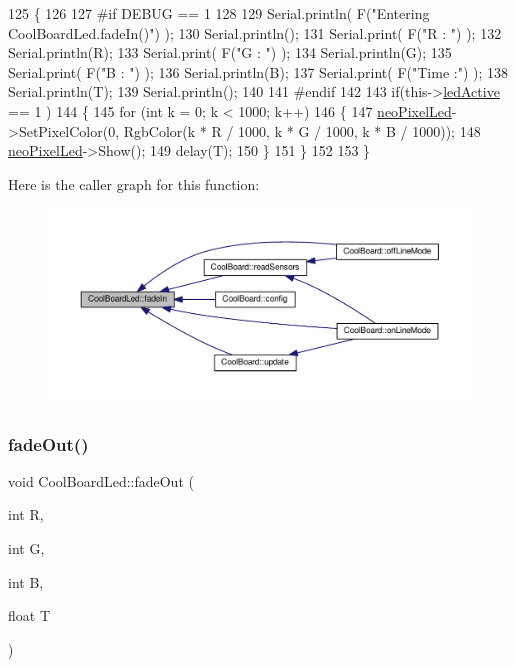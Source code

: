 \begin{DoxyCode}
125 \{
126 
127 \textcolor{preprocessor}{#if DEBUG == 1}
128 
129     Serial.println( F(\textcolor{stringliteral}{"Entering CoolBoardLed.fadeIn()"}) );
130     Serial.println();
131     Serial.print( F(\textcolor{stringliteral}{"R : "}) );
132     Serial.println(R);
133     Serial.print( F(\textcolor{stringliteral}{"G : "}) );
134     Serial.println(G);
135     Serial.print( F(\textcolor{stringliteral}{"B : "}) );
136     Serial.println(B);
137     Serial.print( F(\textcolor{stringliteral}{"Time :"}) );
138     Serial.println(T);
139     Serial.println();
140 
141 \textcolor{preprocessor}{#endif  }
142     
143     \textcolor{keywordflow}{if}(this->\hyperlink{class_cool_board_led_aadd04d2ecf123247718d77f42fba7f08}{ledActive} == 1 )
144     \{
145         \textcolor{keywordflow}{for} (\textcolor{keywordtype}{int} k = 0; k < 1000; k++) 
146         \{
147             \hyperlink{class_cool_board_led_ac2c13fa462a010cd9242bf297c013923}{neoPixelLed}->SetPixelColor(0, RgbColor(k * R / 1000, k * G / 1000, k * B / 1000));
148             \hyperlink{class_cool_board_led_ac2c13fa462a010cd9242bf297c013923}{neoPixelLed}->Show();
149             delay(T);
150         \}
151     \}
152 
153 \}
\end{DoxyCode}
Here is the caller graph for this function\+:\nopagebreak
\begin{figure}[H]
\begin{center}
\leavevmode
\includegraphics[width=350pt]{de/dc0/class_cool_board_led_ab778f5e7bed0ab74e3906d82110493c3_icgraph}
\end{center}
\end{figure}
\mbox{\label{class_cool_board_led_a93d545679237e8cc858324367149775c}} 
\subsubsection{\texorpdfstring{fade\+Out()}{fadeOut()}}
{\footnotesize\ttfamily void Cool\+Board\+Led\+::fade\+Out (\begin{DoxyParamCaption}\item[{int}]{R,  }\item[{int}]{G,  }\item[{int}]{B,  }\item[{float}]{T }\end{DoxyParamCaption})}

